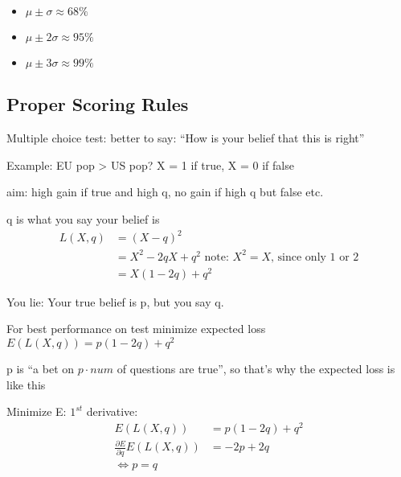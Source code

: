 \begin{itemize}
	\item $\mu \pm \sigma \approx 68\%$
	\item $\mu \pm 2\sigma \approx 95\%$
	\item $\mu \pm 3\sigma \approx 99\%$
\end{itemize}

\subsection{Proper Scoring Rules}
Multiple choice test: better to say: ``How is your belief that this is right''

Example: EU pop > US pop? X = 1 if true, X = 0 if false

aim: high gain if true and high q, no gain if high q but false etc.

q is what you say your belief is 
\begin{align*}
L(X,q) &= (X-q)^2 \\
       &= X^2-2qX+q^2 \mbox{ note: $X^2 = X$, since only 1 or 2} \\
       &= X(1-2q)+q^2
\end{align*}

You lie: Your true belief is p, but you say q.

For best performance on test minimize expected loss $E(L(X,q)) = p(1-2q)+q^2$

p is ``a bet on $p\cdot num$ of questions are true'', so that's why the expected loss is like this

Minimize E: $1^{st}$ derivative:
\begin{align*}
E(L(X,q)) &= p(1-2q)+q^2 \\
\frac{\partial E}{\partial q}E(L(X,q)) &= -2p + 2q \\
\Leftrightarrow p = q
\end{align*}




